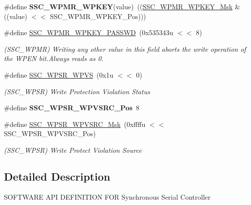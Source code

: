 \begin{DoxyCompactItemize}
\#define {\bfseries S\+S\+C\+\_\+\+W\+P\+M\+R\+\_\+\+W\+P\+K\+EY}(value)~((\mbox{\hyperlink{group__SAMV71__SSC_ga7be187a275ddfe23b8a1858da272aacc}{S\+S\+C\+\_\+\+W\+P\+M\+R\+\_\+\+W\+P\+K\+E\+Y\+\_\+\+Msk}} \& ((value) $<$$<$ S\+S\+C\+\_\+\+W\+P\+M\+R\+\_\+\+W\+P\+K\+E\+Y\+\_\+\+Pos)))
\item 
\mbox{\label{group__SAME70__SSC_ga4bac2da515b27c22389630b3e99a9f78}} 
\#define \mbox{\hyperlink{group__SAME70__SSC_ga4bac2da515b27c22389630b3e99a9f78}{S\+S\+C\+\_\+\+W\+P\+M\+R\+\_\+\+W\+P\+K\+E\+Y\+\_\+\+P\+A\+S\+S\+WD}}~(0x535343u $<$$<$ 8)
\begin{DoxyCompactList}\small\item\em (S\+S\+C\+\_\+\+W\+P\+MR) Writing any other value in this field aborts the write operation of the W\+P\+EN bit.\+Always reads as 0. \end{DoxyCompactList}\item 
\mbox{\label{group__SAME70__SSC_ga842b1f6249a5c171786a2ae3881db56c}} 
\#define \mbox{\hyperlink{group__SAME70__SSC_ga842b1f6249a5c171786a2ae3881db56c}{S\+S\+C\+\_\+\+W\+P\+S\+R\+\_\+\+W\+P\+VS}}~(0x1u $<$$<$ 0)
\begin{DoxyCompactList}\small\item\em (S\+S\+C\+\_\+\+W\+P\+SR) Write Protection Violation Status \end{DoxyCompactList}\item 
\mbox{\label{group__SAME70__SSC_ga1c4da89fbe8aa1d737f1f41bec925bdb}} 
\#define {\bfseries S\+S\+C\+\_\+\+W\+P\+S\+R\+\_\+\+W\+P\+V\+S\+R\+C\+\_\+\+Pos}~8
\item 
\mbox{\label{group__SAME70__SSC_ga6dbf65973e943e7e2653cc10687ae629}} 
\#define \mbox{\hyperlink{group__SAME70__SSC_ga6dbf65973e943e7e2653cc10687ae629}{S\+S\+C\+\_\+\+W\+P\+S\+R\+\_\+\+W\+P\+V\+S\+R\+C\+\_\+\+Msk}}~(0xffffu $<$$<$ S\+S\+C\+\_\+\+W\+P\+S\+R\+\_\+\+W\+P\+V\+S\+R\+C\+\_\+\+Pos)
\begin{DoxyCompactList}\small\item\em (S\+S\+C\+\_\+\+W\+P\+SR) Write Protect Violation Source \end{DoxyCompactList}\end{DoxyCompactItemize}


\subsection{Detailed Description}
S\+O\+F\+T\+W\+A\+RE A\+PI D\+E\+F\+I\+N\+I\+T\+I\+ON F\+OR Synchronous Serial Controller 